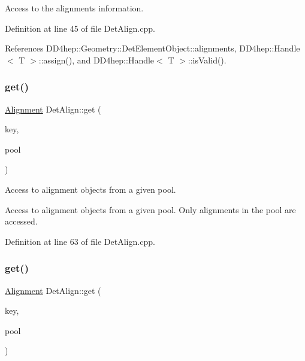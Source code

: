 Access to the alignments information. 



Definition at line 45 of file Det\+Align.\+cpp.



References D\+D4hep\+::\+Geometry\+::\+Det\+Element\+Object\+::alignments, D\+D4hep\+::\+Handle$<$ T $>$\+::assign(), and D\+D4hep\+::\+Handle$<$ T $>$\+::is\+Valid().

\hypertarget{class_d_d4hep_1_1_alignments_1_1_det_align_a1487afd0d23a2ce523b29c7e502bf0bd}{}\label{class_d_d4hep_1_1_alignments_1_1_det_align_a1487afd0d23a2ce523b29c7e502bf0bd} 
\subsubsection{\texorpdfstring{get()}{get()}\hspace{0.1cm}{\footnotesize\ttfamily [1/4]}}
{\footnotesize\ttfamily \hyperlink{class_d_d4hep_1_1_alignments_1_1_alignment}{Alignment} Det\+Align\+::get (\begin{DoxyParamCaption}\item[{const std\+::string \&}]{key,  }\item[{const \hyperlink{class_d_d4hep_1_1_alignments_1_1_det_align_a0595e4c0ee7f454cf5e9c5d32b718aca}{User\+Pool} \&}]{pool }\end{DoxyParamCaption})}



Access to alignment objects from a given pool. 

Access to alignment objects from a given pool. Only alignments in the pool are accessed. 

Definition at line 63 of file Det\+Align.\+cpp.

\hypertarget{class_d_d4hep_1_1_alignments_1_1_det_align_a25f066eaf3999061359f7a46fbd4cfe1}{}\label{class_d_d4hep_1_1_alignments_1_1_det_align_a25f066eaf3999061359f7a46fbd4cfe1} 
\subsubsection{\texorpdfstring{get()}{get()}\hspace{0.1cm}{\footnotesize\ttfamily [2/4]}}
{\footnotesize\ttfamily \hyperlink{class_d_d4hep_1_1_alignments_1_1_alignment}{Alignment} Det\+Align\+::get (\begin{DoxyParamCaption}\item[{\hyperlink{class_d_d4hep_1_1_alignments_1_1_alignment_ab824a65f935a0c79b9ea1a7a85014b88}{Alignment\+::key\+\_\+type}}]{key,  }\item[{const \hyperlink{class_d_d4hep_1_1_alignments_1_1_det_align_a0595e4c0ee7f454cf5e9c5d32b718aca}{User\+Pool} \&}]{pool }\end{DoxyParamCaption})}



